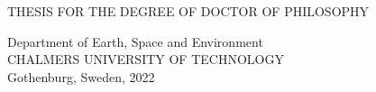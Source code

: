 \begin{titlepage}
  \begin{center}

    {\sc%
      THESIS FOR THE DEGREE OF DOCTOR OF PHILOSOPHY 
    }

    \vspace*{5cm}
    \Large{\textbf{\thetitle}}
    \normalsize

    
    \vspace{1.0cm}

    \theauthor

    \vfill
    
    \vspace{5cm}

    {
      Department of Earth, Space and Environment \\
      {\sc CHALMERS UNIVERSITY OF TECHNOLOGY}\\
      Gothenburg, Sweden, 2022 \\
    }


    
    
  \end{center}
\end{titlepage}
